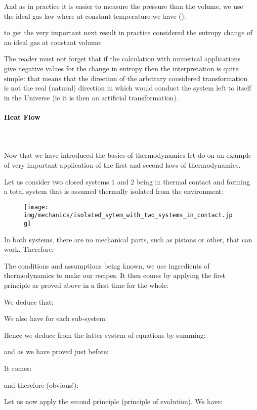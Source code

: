 	And as in practice it is easier to measure the pressure than the volume, we use the ideal gas law where at constant temperature we have ():
	
	to get the very important next result in practice considered the entropy change of an ideal gas at constant volume:
	
	The reader must not forget that if the calculation with numerical applications give negative values for the change in entropy then the interpretation is quite simple: that means that the direction of the arbitrary considered transformation is not the real (natural) direction in which would conduct the system left to itself in the Universe (ie it is then an artificial transformation).

	\pagebreak
	\paragraph{Heat Flow}\mbox{}\\\\
	Now that we have introduced the basics of thermodynamics let do on an example of very important application of the first and second laws of thermodynamics.

	Let us consider two closed systems $1$ and $2$ being in thermal contact and forming a total system that is assumed thermally isolated from the environment:
	\begin{figure}[H]
		\centering
		\texttt{[image: img/mechanics/isolated\_sytem\_with\_two\_systems\_in\_contact.jpg]}
	\end{figure}
	In both systems, there are no mechanical parts, such as pistons or other, that can work. Therefore:
	
	The conditions and assumptions being known, we use ingredients of thermodynamics to make our recipes. It then comes by applying the first principle as proved above in a first time for the whole:
	
	We deduce that:
	
	We also have for each sub-system:
		
	Hence we deduce from the latter system of equations by summing:
	
	and as we have proved just before:
	
	It comes:
	
	and therefore (obvious!):
	
	Let us now apply the second principle (principle of evolution). We have:
	
